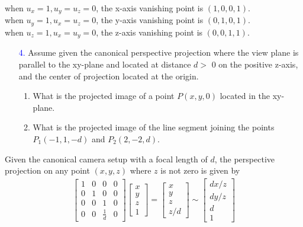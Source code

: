 \documentclass[11pt]{article}  %
\begin{document}
    \indent when $u_x=1,u_y=u_z=0$, the x-axis vanishing point is $(1,0,0,1)$.\\
    \indent when $u_y=1,u_x=u_z=0$, the y-axis vanishing point is $(0,1,0,1)$.\\
    \indent when $u_z=1,u_x=u_y=0$, the z-axis vanishing point is $(0,0,1,1)$.\vspace{2mm}

    \begin{enumerate}[leftmargin=*]
        \item[\textcolor{blue}{4.}] Assume given the canonical perspective projection where the view plane is parallel to the xy-plane and located at distance $d>$ 0 on the positive z-axis, and the center of projection located at the origin.
        \begin{enumerate}
            \item What is the projected image of a point $P(x,y,0)$ located in the xy-plane.
            \item What is the projected image of the line segment joining the points $P_1(-1,1,-d)$ and $P_2(2,-2,d)$.
        \end{enumerate}
    \end{enumerate}
    
    \solution
    
    Given the canonical camera setup with a focal length of $d$, the perspective projection on any point $(x,y,z)$ where $z$ is not zero is given by
    \begin{align*}
        \begin{bmatrix}
            1 & 0 & 0 & 0\\
            0 & 1 & 0 & 0\\
            0 & 0 & 1 & 0\\
            0 & 0 & \frac{1}{d} & 0
        \end{bmatrix}
        \begin{bmatrix}
            x\\y\\z\\1
        \end{bmatrix}
        =
        \begin{bmatrix}
            x\\y\\z\\z/d
        \end{bmatrix}
        \sim
        \begin{bmatrix}
            dx/z\\dy/z\\d\\1
        \end{bmatrix}
    \end{align*}
    
\end{document}
